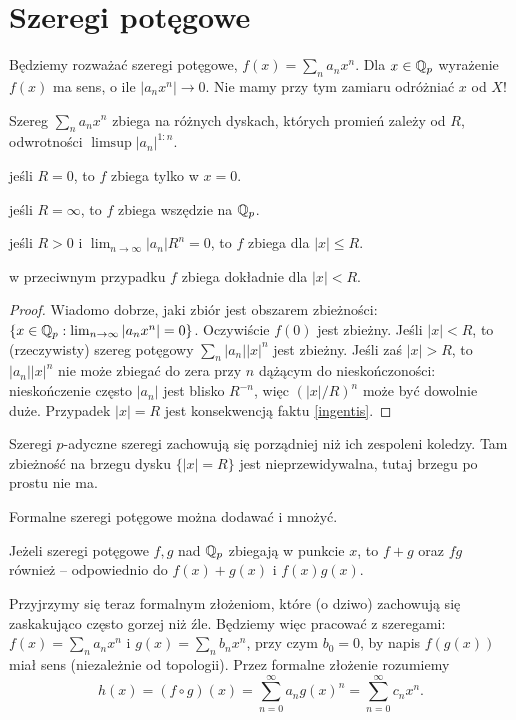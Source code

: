 \section{Szeregi potęgowe}
Będziemy rozważać szeregi potęgowe, $f(x) = \sum_n a_n x^n$.
Dla $x \in \mathbb Q_p$ wyrażenie $f(x)$ ma sens, o ile $|a_n x^n | \to 0$.
Nie mamy przy tym zamiaru odróżniać $x$ od $X$!

\begin{fakt}
	Szereg $\sum_n a_n x^n$ zbiega na różnych dyskach, których promień zależy od $R$, odwrotności $\limsup |a_n|^{1:n}$.
	\begin{enumx}
	\item jeśli $R = 0$, to $f$ zbiega tylko w $x = 0$.
	\item jeśli $R = \infty$, to $f$ zbiega wszędzie na $\mathbb Q_p$.
	\item jeśli $R > 0$ i $\lim_{n \to \infty} |a_n| R^n = 0$, to $f$ zbiega dla $|x| \le R$.
	\item w przeciwnym przypadku $f$ zbiega dokładnie dla $|x| < R$.
	\end{enumx}
\end{fakt}

\begin{proof}
	Wiadomo dobrze, jaki zbiór jest obszarem zbieżności: $\{x \in \mathbb Q_p : \lim_{n \to \infty} |a_n x^n| = 0\}$.
	Oczywiście $f(0)$ jest zbieżny.
	Jeśli $|x| < R $, to (rzeczywisty) szereg potęgowy $\sum_n |a_n| |x|^n$ jest zbieżny.
	Jeśli zaś $|x| > R $, to $|a_n| |x|^n$ nie może zbiegać do zera przy $n$ dążącym do nieskończoności: nieskończenie często $|a_n|$ jest blisko $R ^{-n}$, więc $(|x|/R )^n$ może być dowolnie duże.
	Przypadek $|x| = R $ jest konsekwencją faktu \ref{ingentis}.
\end{proof}

Szeregi $p$-adyczne szeregi zachowują się porządniej niż ich zespoleni koledzy.
Tam zbieżność na brzegu dysku $\{|x| = R \}$ jest nieprzewidywalna, tutaj brzegu po prostu nie ma.

Formalne szeregi potęgowe można dodawać i mnożyć.

\begin{fakt}\label{decoris}
	Jeżeli szeregi potęgowe $f, g$ nad $\mathbb Q_p$ zbiegają w punkcie $x$, to $f+g$ oraz $fg$ również -- odpowiednio do $f(x) + g(x)$ i $f(x)g(x)$.
\end{fakt}

Przyjrzymy się teraz formalnym złożeniom, które (o dziwo) zachowują się zaskakująco często gorzej niż źle.
Będziemy więc pracować z szeregami: $f(x) = \sum_n a_n x^n$ i $g(x) = \sum_n b_n x^n$, przy czym $b_0 = 0$, by napis $f(g(x))$ miał sens (niezależnie od topologii).
Przez formalne złożenie rozumiemy
\[
	h(x) = (f \circ g)(x) = \sum_{n = 0}^\infty a_n g(x)^n = \sum_{n = 0}^\infty c_n x^n.
\]

